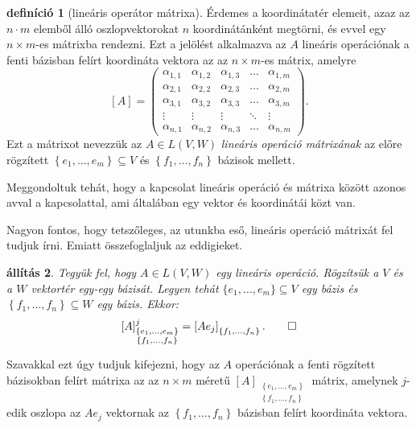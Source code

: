 \documentclass[a4paper, showtrims]{memoir}
\theoremstyle{plain}
\newtheorem{proposition}{állítás}[chapter]
\theoremstyle{remark}
\theoremstyle{definition}
\newtheorem{definition}[proposition]{definíció}
\begin{document}
\begin{definition}[lineáris operátor mátrixa]
	Érdemes a koordinátatér elemeit, azaz az $n\cdot m$ elemből álló oszlopvektorokat $n$ koordinátánként megtörni,
	és evvel egy $n\times m$-es mátrixba rendezni.
	Ezt a jelölést alkalmazva az $A$ lineáris operációnak a fenti bázisban felírt koordináta vektora az az
	$n\times m$-es mátrix,
	amelyre
	\[
		[A]=
		\begin{pmatrix}
			\alpha_{1,1} & \alpha_{1,2} & \alpha_{1,3} & \dots  & \alpha_{1,m} \\
			\alpha_{2,1} & \alpha_{2,2} & \alpha_{2,3} & \dots  & \alpha_{2,m} \\
			\alpha_{3,1} & \alpha_{3,2} & \alpha_{3,3} & \dots  & \alpha_{3,m} \\
			\vdots       & \vdots       & \vdots       & \ddots & \vdots       \\
			\alpha_{n,1} & \alpha_{n,2} & \alpha_{n,3} & \dots  & \alpha_{n,m}
		\end{pmatrix}.
	\]
	Ezt a mátrixot nevezzük az
	$A\in L\left( V,W \right)$ \emph{lineáris operáció mátrixának}
	az előre rögzített
	$\left\{e_1,\ldots,e_m  \right\}\subseteq V$ és $\left\{ f_1,\ldots,f_n \right\}$ bázisok mellett.
\end{definition}
Meggondoltuk tehát, hogy a kapcsolat lineáris operáció és mátrixa között azonos avval a kapcsolattal,
ami általában egy vektor és koordinátái közt van.

Nagyon fontos, hogy tetszőleges, az utunkba eső, lineáris operáció mátrixát fel tudjuk írni.
Emiatt összefoglaljuk az eddigieket.
\begin{proposition}
	Tegyük fel, hogy $A\in L\left( V,W \right)$ egy lineáris operáció.
	Rögzítsük a $V$ és a $W$ vektortér egy-egy bázisát.
	Legyen tehát $\{e_1,\ldots,e_m\}\subseteq V$ egy bázis és
	$\left\{ f_1,\ldots,f_n \right\}\subseteq W$ egy bázis.
    Ekkor:
	\[
		[A]_{\substack{\left\{ e_1,\ldots,e_m \right\}\\ \left\{ f_1,\ldots,f_n \right\}}}^j
		=
		\left[ Ae_j \right]_{\left\{ f_1,\ldots,f_n \right\}}.
		\qedhere
	\]
\end{proposition}
Szavakkal ezt úgy tudjuk kifejezni, hogy 
	az $A$ operációnak a fenti rögzített bázisokban felírt mátrixa az az
	$n\times m$ méretű
	$[A]_{\substack{\left\{ e_1,\ldots,e_m \right\}\\ \left\{ f_1,\ldots,f_n \right\}}}$
	mátrix,
	amelynek $j$-edik oszlopa az $Ae_j$ vektornak az $\left\{f_1,\ldots,f_n \right\}$ bázisban felírt koordináta vektora.
    
\end{document}
